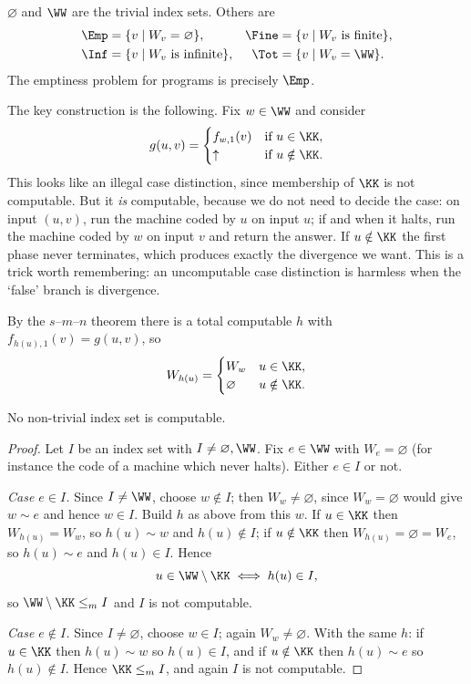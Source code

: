 \begin{example}
	$\varnothing$ and $\WW$ are the trivial index sets. Others are
	\begin{align*}
		\Emp &= \{v \mid W_v = \varnothing\}, & \Fine &= \{v \mid W_v \text{ is finite}\}, \\
		\Inf &= \{v \mid W_v \text{ is infinite}\}, & \Tot &= \{v \mid W_v = \WW\}.
	\end{align*}
	The emptiness problem for programs is precisely $\Emp$.
\end{example}

The key construction is the following. Fix $w \in \WW$ and consider
$$g(u,v) = \begin{cases} f_{w,1}(v) & \text{if } u \in \KK, \\ \uparrow & \text{if } u \notin \KK.\end{cases}$$
This looks like an illegal case distinction, since membership of $\KK$ is not computable. But it \emph{is} computable, because we do not need to decide the case: on input $(u,v)$, run the machine coded by $u$ on input $u$; if and when it halts, run the machine coded by $w$ on input $v$ and return the answer. If $u \notin\KK$ the first phase never terminates, which produces exactly the divergence we want. This is a trick worth remembering: an uncomputable case distinction is harmless when the `false' branch is divergence.

By the $s$--$m$--$n$ theorem there is a total computable $h$ with $f_{h(u),1}(v) = g(u,v)$, so
$$W_{h(u)} = \begin{cases} W_w & u \in \KK, \\ \varnothing & u \notin \KK.\end{cases}$$

\begin{theorem}[Rice]\label{thm:rice}
	No non-trivial index set is computable.
\end{theorem}

\begin{proof}
	Let $I$ be an index set with $I \neq\varnothing,\WW$. Fix $e \in \WW$ with $W_e = \varnothing$ (for instance the code of a machine which never halts). Either $e \in I$ or not.

	\emph{Case $e \in I$.} Since $I \neq \WW$, choose $w \notin I$; then $W_w \neq \varnothing$, since $W_w = \varnothing$ would give $w \sim e$ and hence $w \in I$. Build $h$ as above from this $w$. If $u \in \KK$ then $W_{h(u)} = W_w$, so $h(u)\sim w$ and $h(u)\notin I$; if $u \notin\KK$ then $W_{h(u)} = \varnothing = W_e$, so $h(u)\sim e$ and $h(u)\in I$. Hence
	$$u \in \WW\setminus\KK \iff h(u) \in I,$$
	so $\WW\setminus\KK \leq_m I$ and $I$ is not computable.

	\emph{Case $e \notin I$.} Since $I \neq\varnothing$, choose $w \in I$; again $W_w \neq\varnothing$. With the same $h$: if $u \in \KK$ then $h(u)\sim w$ so $h(u)\in I$, and if $u\notin\KK$ then $h(u)\sim e$ so $h(u)\notin I$. Hence $\KK \leq_m I$, and again $I$ is not computable.
\end{proof}

